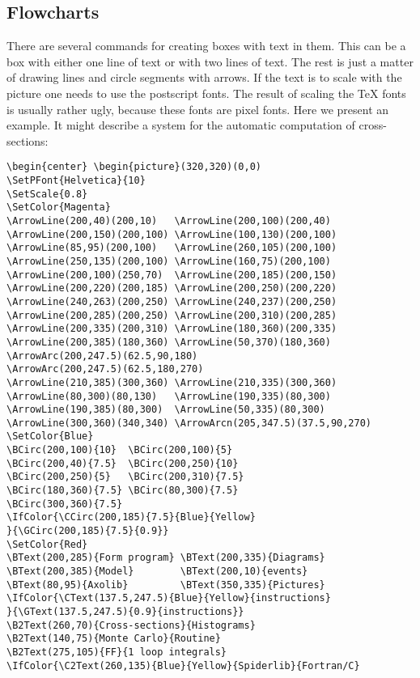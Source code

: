 \subsection{Flowcharts}

There are several commands for creating boxes with text in them. This can 
be a box with either one line of text or with two lines of text. The rest 
is just a matter of drawing lines and circle segments with arrows. If the 
text is to scale with the picture one needs to use the postscript fonts. 
The result of scaling the {\TeX} fonts is usually rather ugly, because 
these fonts are pixel fonts. Here we present an example. It might describe 
a system for the automatic computation of cross-sections:
\IfColor{\textBlue}{}
\begin{verbatim}
\begin{center} \begin{picture}(320,320)(0,0)
\SetPFont{Helvetica}{10}
\SetScale{0.8}
\SetColor{Magenta}
\ArrowLine(200,40)(200,10)   \ArrowLine(200,100)(200,40)
\ArrowLine(200,150)(200,100) \ArrowLine(100,130)(200,100)
\ArrowLine(85,95)(200,100)   \ArrowLine(260,105)(200,100)
\ArrowLine(250,135)(200,100) \ArrowLine(160,75)(200,100)
\ArrowLine(200,100)(250,70)  \ArrowLine(200,185)(200,150)
\ArrowLine(200,220)(200,185) \ArrowLine(200,250)(200,220)
\ArrowLine(240,263)(200,250) \ArrowLine(240,237)(200,250)
\ArrowLine(200,285)(200,250) \ArrowLine(200,310)(200,285)
\ArrowLine(200,335)(200,310) \ArrowLine(180,360)(200,335)
\ArrowLine(200,385)(180,360) \ArrowLine(50,370)(180,360)
\ArrowArc(200,247.5)(62.5,90,180)
\ArrowArc(200,247.5)(62.5,180,270)
\ArrowLine(210,385)(300,360) \ArrowLine(210,335)(300,360)
\ArrowLine(80,300)(80,130)   \ArrowLine(190,335)(80,300)
\ArrowLine(190,385)(80,300)  \ArrowLine(50,335)(80,300)
\ArrowLine(300,360)(340,340) \ArrowArcn(205,347.5)(37.5,90,270)
\SetColor{Blue}
\BCirc(200,100){10}  \BCirc(200,100){5}
\BCirc(200,40){7.5}  \BCirc(200,250){10}
\BCirc(200,250){5}   \BCirc(200,310){7.5}
\BCirc(180,360){7.5} \BCirc(80,300){7.5}
\BCirc(300,360){7.5}
\IfColor{\CCirc(200,185){7.5}{Blue}{Yellow}
}{\GCirc(200,185){7.5}{0.9}}
\SetColor{Red}
\BText(200,285){Form program} \BText(200,335){Diagrams}
\BText(200,385){Model}        \BText(200,10){events}
\BText(80,95){Axolib}         \BText(350,335){Pictures}
\IfColor{\CText(137.5,247.5){Blue}{Yellow}{instructions}
}{\GText(137.5,247.5){0.9}{instructions}}
\B2Text(260,70){Cross-sections}{Histograms}
\B2Text(140,75){Monte Carlo}{Routine}
\B2Text(275,105){FF}{1 loop integrals}
\IfColor{\C2Text(260,135){Blue}{Yellow}{Spiderlib}{Fortran/C}

\end{verbatim}
